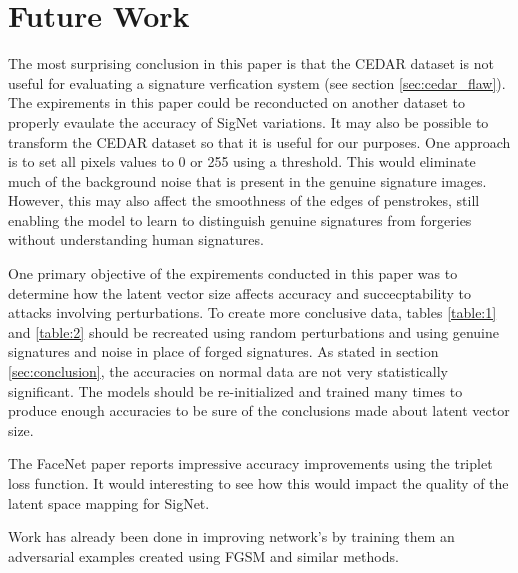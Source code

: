 \section{Future Work}\label{sec:future_work}

The most surprising conclusion in this paper is that the CEDAR dataset is not useful for evaluating a signature verfication system (see section \ref{sec:cedar_flaw}).
The expirements in this paper could be reconducted on another dataset to properly evaulate the accuracy of SigNet variations.
It may also be possible to transform the CEDAR dataset so that it is useful for our purposes.
One approach is to set all pixels values to 0 or 255 using a threshold.
This would eliminate much of the background noise that is present in the genuine signature images.
However, this may also affect the smoothness of the edges of penstrokes, still enabling the model to learn to distinguish genuine signatures from forgeries without understanding human signatures.

One primary objective of the expirements conducted in this paper was to determine how the latent vector size affects accuracy and succecptability to attacks involving perturbations.
To create more conclusive data, tables \ref{table:1} and \ref{table:2} should be recreated using random perturbations and using genuine signatures and noise in place of forged signatures.
As stated in section \ref{sec:conclusion}, the accuracies on normal data are not very statistically significant.
The models should be re-initialized and trained many times to produce enough accuracies to be sure of the conclusions made about latent vector size.

The FaceNet paper reports impressive accuracy improvements using the triplet loss function.
It would interesting to see how this would impact the quality of the latent space mapping for SigNet.

Work has already been done in improving network's by training them an adversarial examples created using FGSM and similar methods.


